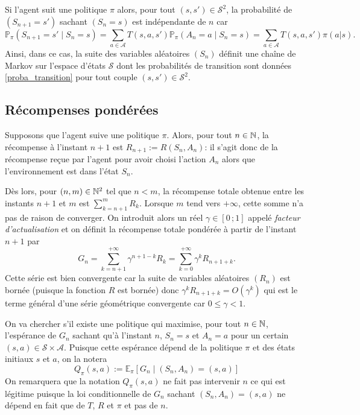 Si l'agent suit une politique $\pi$ alors, pour tout $(s,s')\in\mathcal{S}^2$, la probabilité de $(S_{n+1}=s')$ sachant $(S_n=s)$ est indépendante de $n$ car
\begin{equation}
\mathbb{P}_{\pi}(S_{n+1}=s' \mid S_n=s)=\sum_{a\in\mathcal{A}} T(s,a,s')\mathbb{P}_{\pi}(A_n=a \mid S_n=s) =  \sum_{a\in\mathcal{A}} T(s,a,s')\pi(a|s).
\label{proba_transition}
\end{equation}
Ainsi, dans ce cas, la suite des variables aléatoires $(S_n)$ définit une chaîne de Markov sur l'espace d'états $\mathcal{S}$ dont les probabilités de transition sont données \eqref{proba_transition} pour tout couple $(s,s')\in\mathcal{S}^2$.

\subsection{Récompenses pondérées}

Supposons que l'agent suive une politique $\pi$. Alors, pour tout $n\in\mathbb{N}$, la récompense à l'instant $n+1$ est $R_{n+1}:=R(S_n,A_n)$: il s'agit donc de la récompense reçue par l'agent pour avoir choisi l'action $A_n$ alors que l'environnement est dans l'état $S_n$.  

Dès lors, pour $(n,m)\in\mathbb{N}^2$ tel que $n<m$, la récompense totale obtenue entre les instants $n+1$ et $m$ est $\displaystyle \sum_{k=n+1}^{m} R_k$. Lorsque $m$ tend vers $+\infty$, cette somme n'a pas de raison de converger. On introduit alors un réel $\gamma\in[0\,;1]$ appelé \textit{facteur d'actualisation} et on définit la récompense  totale pondérée à partir de l'instant $n+1$ par
\begin{equation}
G_{n}=\sum_{k=n+1}^{+\infty} \gamma^{n+1-k}R_k=\sum_{k=0}^{+\infty} \gamma^k R_{n+1+k}.
\label{recompense_ponderee}
\end{equation}
Cette série est bien convergente car la suite de variables aléatoires $(R_n)$ est bornée (puisque la fonction $R$ est bornée) donc $\gamma^k R_{n+1+k}=O(\gamma^k)$ qui est le terme général d'une série géométrique convergente car $0 \leqslant \gamma < 1$.

On va chercher s'il existe une politique qui maximise, pour tout $n\in\mathbb{N}$, l'espérance de $G_{n}$ sachant qu'à l'instant $n$, $S_n=s$ et $A_n=a$ pour un certain $(s,a)\in\mathcal{S}\times\mathcal{A}$. Puisque cette espérance dépend de la politique $\pi$ et des états initiaux $s$ et $a$, on la notera
\begin{equation}
Q_{\pi}(s,a):=\mathbb{E}_{\pi}\left[G_{n} \mid (S_n, A_n)=(s,a)\right]
\label{esperance_recompense}
\end{equation}
On remarquera que la notation $Q_{\pi}(s,a)$ ne fait pas intervenir $n$ ce qui est légitime puisque la loi conditionnelle de $G_{n}$ sachant $(S_n, A_n)=(s,a)$ ne dépend en fait que de $T$, $R$ et $\pi$ et pas de $n$.

